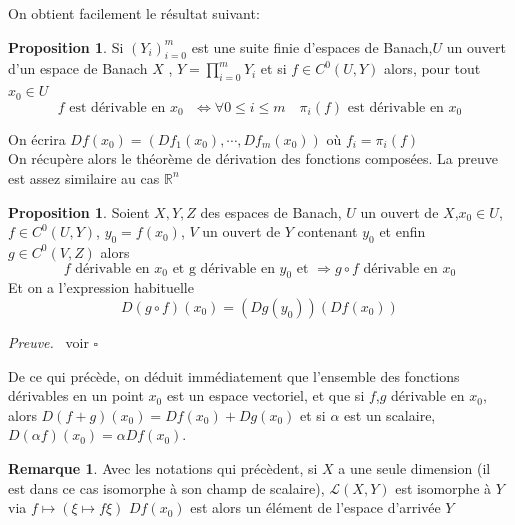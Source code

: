\documentclass[a4paper,12pt,oneside,titlepage]{article}
\theoremstyle{definition}
\newtheorem{proposition}[definition]{Proposition}
\newtheorem{remarque}[definition]{Remarque}
\theoremstyle{plain}
\newenvironment{preuve}
{\par\noindent\textit{Preuve.}\ }
{\hfill$\square$\par}
\begin{document}
On obtient facilement le résultat suivant:
\begin{proposition}
    Si $(Y_i)_{i=0}^m$ est une suite finie d'espaces de Banach,$U$ un ouvert d'un espace de Banach $X$ , $Y=\prod_{i=0}^m Y_i$ 
    et si $f\in C^0(U,Y)$ alors, pour tout $x_0\in U$
    \begin{equation*}
    f \text{ est dérivable en $x_0$ }
    \Leftrightarrow \forall 0\leq i \leq m\quad  \pi_i(f) \text{ est dérivable en $x_0$} 
    \end{equation*}
\end{proposition}
On écrira $Df(x_0)=(Df_1(x_0),\cdots,Df_m(x_0))$ où $f_i=\pi_i(f)$
\\
On récupère alors le théorème de dérivation des fonctions composées. La preuve est assez similaire au cas $\mathbb{R}^n$
\begin{proposition}
    Soient $X,Y,Z$ des espaces de Banach, $U$ un ouvert de $X$,$x_0\in U$, $f\in C^0(U,Y)$, $y_0=f(x_0)$, $V$ un ouvert de $Y$ contenant $y_0$ et enfin  $g\in C^0(V,Z)$ alors 
    \begin{equation*}
        f\text{ dérivable en  $x_0$ et g dérivable en $y_0$ et }\Rightarrow g\circ f \text{ dérivable en $x_0$}  
    \end{equation*}
Et on a l'expression habituelle
\begin{equation*}
    D(g\circ f)(x_0)= (Dg(y_0))(Df(x_0))
\end{equation*}

\end{proposition}
\begin{preuve}
    voir \cite{dieudonne1969fma8}
\end{preuve}


De ce qui précède, on déduit immédiatement que l'ensemble des fonctions dérivables en un point $x_0$ est un espace vectoriel, et que si $f$,$g$ dérivable en $x_0$, alors 
$D (f+g)(x_0)=Df(x_0)+Dg(x_0)$ et si $\alpha$ est un scalaire,
$D(\alpha f)(x_0)=\alpha Df(x_0)$.
\begin{remarque}\label{remarque 1-dim}
    Avec les notations qui précèdent, si $X$ a une seule dimension (il est dans ce cas isomorphe à son champ de scalaire), $\mathcal{L}(X,Y)$ est isomorphe à $Y$ via $f\mapsto (\xi\mapsto f\xi)$
    $Df(x_0)$ est alors un élément de l'espace d'arrivée $Y$
\end{remarque}
   
\end{document}
